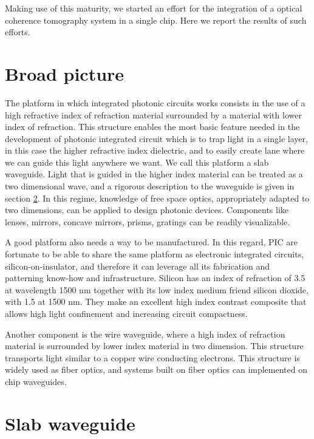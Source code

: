 \documentclass[12pt,twoside,english]{book}
\renewcommand{\~}{\perispomeni}%
\numberwithin{equation}{section}
\numberwithin{figure}{section}
\begin{document}
Making use of this maturity, we started an effort for the integration of a optical coherence tomography system in a single chip. Here we report the results of such efforts. 

\section{Broad picture}

The platform in which integrated photonic circuits works consists in the use of a high refractive index of refraction material surrounded by a material with lower index of refraction. This structure enables the most basic feature needed in the development of photonic integrated circuit which is to trap light in a single layer, in this case the higher refractive index dielectric, and to easily create lane where we can guide this light anywhere we want. We call this platform a \gls{slab waveguide}. Light that is guided in the higher index material can be treated as a two dimensional wave, and a rigorous description to the waveguide is given in section \ref{section:slab waveguide}. In this regime, knowledge of free space optics, appropriately adapted to two dimensions, can be applied to design photonic devices. Components like lenses, mirrors, concave mirrors, prisms, gratings can be readily visualizable.

A good platform also needs a way to be manufactured. In this regard, \gls{PIC} are fortunate to be able to share the same platform as electronic integrated circuits, silicon-on-insulator, and therefore it can leverage all its fabrication and patterning know-how and infrastructure. Silicon has an index of refraction of 3.5 at wavelength 1500 nm together with its low index medium friend silicon dioxide, with 1.5 at 1500 nm. They make an excellent high index contrast composite that allows high light confinement and increasing circuit compactness.

Another component is the wire waveguide, where a high index of refraction material is surrounded by lower index material in two dimension. This structure transports light similar to a copper wire conducting electrons. This structure is widely used as fiber optics, and systems built on fiber optics can implemented on chip waveguides.



\section{Slab waveguide}
\label{section:slab waveguide}
\end{document}
